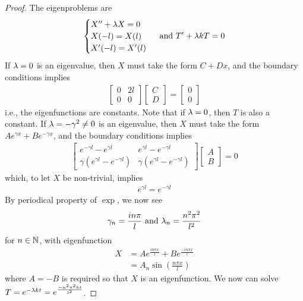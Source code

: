 \documentclass{report}
\begin{document}
\begin{proof}
The eigenproblems are  
\begin{align*}
\begin{cases}
  X'' + \lambda X=0 \\
  X(-l)=X(l)\\
  X'(-l)=X'(l)
\end{cases}\text{ and }T'+ \lambda k T=0
\end{align*}
If $\lambda =0$ is an eigenvalue, then $X$ must take the form  $C+Dx$, and the boundary conditions implies 
 \begin{align*}
\begin{bmatrix}
  0 & 2l\\
  0 & 0
\end{bmatrix} \begin{bmatrix}
C \\
D
\end{bmatrix}=\begin{bmatrix}
0\\
0
\end{bmatrix}
\end{align*}
i.e., the eigenfunctions are constants. Note that if $\lambda =0$, then $T$ is also a constant. If  $\lambda=-\gamma ^2 \neq 0$ is an eigenvalue, then $X$ must take the form $Ae^{\gamma x}+Be^{-\gamma x}$, and the boundary conditions implies 
\begin{align*}
\begin{bmatrix}
  e^{-\gamma l} - e^{\gamma l} & e^{\gamma l}-e^{-\gamma l} \\
  \gamma (e^{\gamma l}-e^{-\gamma l}) & \gamma (e^{\gamma l}-e^{-\gamma l}) 
\end{bmatrix}\begin{bmatrix}
A\\
B
\end{bmatrix}=0 
\end{align*}
which, to let $X$ be non-trivial, implies 
 \begin{align*}
e^{\gamma l}=e^{-\gamma l}
\end{align*}
By periodical property of $\exp$, we now see 
\begin{align*}
\gamma_n= \frac{in\pi }{l}\text{ and }\lambda _n=  \frac{n^2 \pi ^2}{l^2}
\end{align*}
for $n\in\mathbb{N}$, with eigenfunction 
\begin{align*}
X&=Ae^{\frac{i n\pi  x}{l}}+ B e^{\frac{-i n\pi x}{l}}\\
&=A_n \sin (\frac{n \pi  x}{l})
\end{align*}
where $A=-B$ is required so that $X$ is an eigenfunction. We now can solve  $T=e^{-\lambda  kt }=e^{\frac{-n^2 \pi ^2 kt}{l^2}}$. 
\end{proof}
\end{document}
